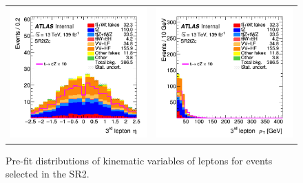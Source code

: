 \begin{figure}[!htbp]
\begin{tabular}{cc}
		\includegraphics[width=.35\textwidth]{Appendices/AP5/figures/SR2/lep3_eta} &
		\includegraphics[width=.35\textwidth]{Appendices/AP5/figures/SR2/lep3_pt} \\
	\end{tabular}
	\caption{Pre-fit distributions of kinematic variables of leptons for events selected in the SR2\tZc.
		\ErrStatOnly
		\Blinded
	}%
	\label{fig:sel:sr2:leps}
\end{figure}

